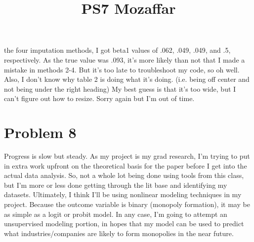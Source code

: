 \documentclass{article} \usepackage[utf8]{inputenc} \title{PS7 Mozaffar}
\begin{document}
the four imputation methods, I got beta1 values of .062, .049, .049, and 
.5, respectively. As the true value was .093, it's more likely than not 
that I made a mistake in methods 2-4. But it's too late to troubleshoot 
my code, so oh well. Also, I don't know why table 2 is doing what it's 
doing. (i.e. being off center and not being under the right heading) My 
best guess is that it's too wide, but I can't figure out how to resize. 
Sorry again but I'm out of time. \section{Problem 8} Progress is slow 
but steady. As my project is my grad research, I'm trying to put in 
extra work upfront on the theoretical basis for the paper before I get 
into the actual data analysis. So, not a whole lot being done using 
tools from this class, but I'm more or less done getting through the lit 
base and identifying my datasets. Ultimately, I think I'll be using 
nonlinear modeling techniques in my project. Because the outcome 
variable is binary (monopoly formation), it may be as simple as a logit 
or probit model. In any case, I'm going to attempt an unsupervised 
modeling portion, in hopes that my model can be used to predict what 
industries/companies are likely to form monopolies in the near future. 
\end{document}
